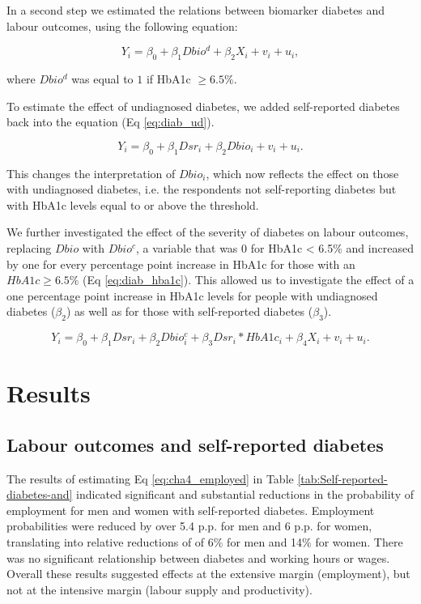 \documentclass[12pt,english]{article}
\begin{document}
In a second step we estimated the relations between biomarker diabetes and labour outcomes, using the following equation:

\begin{equation}
Y_{i}=\beta_{0}+\beta_{1}Dbio^{d}+\beta_{2}X_{i}+v_{i}+u_{i}\label{eq:diab},
\end{equation}

where $Dbio^{d}$ was equal to $1$ if \ac{HbA1c} $\geq 6.5\%$.

To estimate the effect of undiagnosed diabetes, we added self-reported diabetes back into the equation (Eq \ref{eq:diab_ud}).

\begin{equation}
Y_{i}=\beta_{0}+\beta_{1}Dsr_{i}+\beta_{2}Dbio_{i}+v_{i}+u_{i}.\label{eq:diab_ud}
\end{equation}

This changes the interpretation of $Dbio_{i}$, which now reflects the effect on those with undiagnosed diabetes, i.e. the respondents not self-reporting diabetes but with \ac{HbA1c} levels equal to or above the threshold. 

We further investigated the effect of the severity of diabetes on labour outcomes, replacing $Dbio$ with $Dbio^{c}$, a variable that was $0$ for \ac{HbA1c} < 6.5\% and increased by one for every percentage point increase in \ac{HbA1c} for those with an $HbA1c \geq 6.5\%$ (Eq \ref{eq:diab_hba1c}). This allowed us to investigate the effect of a one percentage point increase in \ac{HbA1c} levels for people with undiagnosed diabetes ($\beta_{2}$) as well as for those with self-reported diabetes ($\beta_{3}$).

\begin{equation}
Y_{i}=\beta_{0}+\beta_{1}Dsr_{i}+\beta_{2}Dbio^{c}_{i}+\beta_{3}Dsr_{i}*HbA1c_{i}+\beta_{4}X_{i}+v_{i}+u_{i}.\label{eq:diab_hba1c}
\end{equation}

\section{\label{sec:cha_4_results}Results}


\subsection{Labour outcomes and self-reported diabetes}

The results of estimating Eq \ref{eq:cha4_employed} in Table \ref{tab:Self-reported-diabetes-and} indicated significant and substantial reductions in the probability of employment for men and women with self-reported diabetes. Employment probabilities were reduced by over 5.4 \ac{p.p.} for men and 6 \ac{p.p.} for women, translating into relative reductions of  of 6\% for men and 14\% for women. There was no significant relationship between diabetes and working hours or wages. Overall these results suggested effects at the extensive margin (employment), but not at the intensive margin (labour supply and productivity). 
\end{document}

